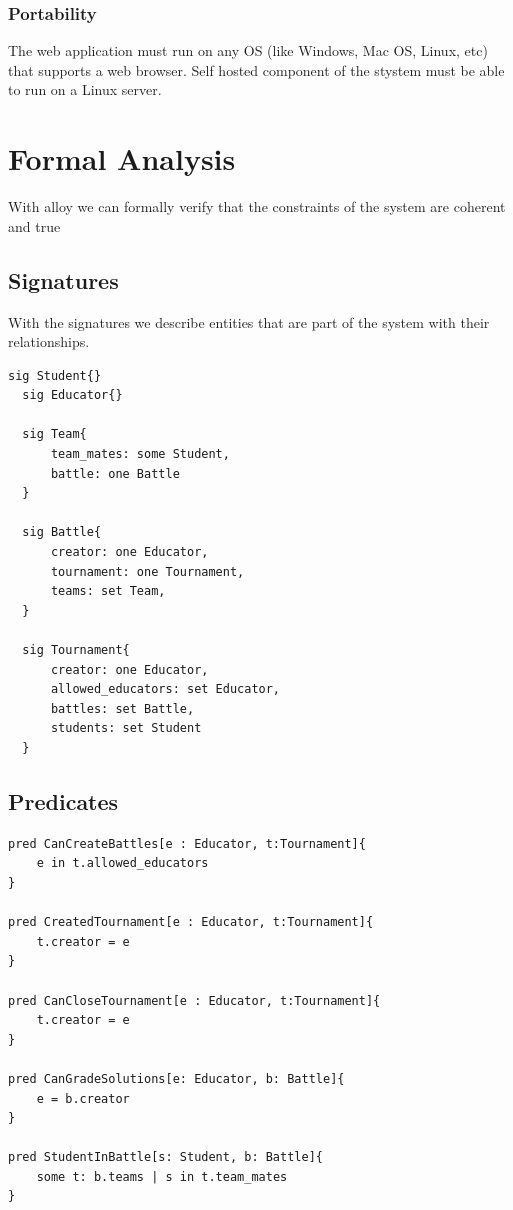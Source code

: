 \documentclass{article}
\begin{document}
\subsubsection{Portability}			
The web application must run on any OS (like Windows, Mac OS, Linux, etc) that supports a web browser.
Self hosted component of the stystem must be able to run on a Linux server.

\newpage
\section{Formal Analysis}
With alloy we can formally verify that the constraints of the system are coherent and true

\subsection{Signatures}
With the signatures we describe entities that are part of the system with their relationships.
\begin{lstlisting}[language=alloy]
  sig Student{}
  sig Educator{}
  
  sig Team{
      team_mates: some Student,
      battle: one Battle
  }
  
  sig Battle{
      creator: one Educator,
      tournament: one Tournament,
      teams: set Team,
  }
  
  sig Tournament{
      creator: one Educator,
      allowed_educators: set Educator,
      battles: set Battle,
      students: set Student
  }
\end{lstlisting}

\subsection{Predicates}
\begin{lstlisting}[language=alloy]
pred CanCreateBattles[e : Educator, t:Tournament]{
    e in t.allowed_educators
}

pred CreatedTournament[e : Educator, t:Tournament]{
    t.creator = e
}

pred CanCloseTournament[e : Educator, t:Tournament]{
    t.creator = e
}

pred CanGradeSolutions[e: Educator, b: Battle]{
    e = b.creator
}

pred StudentInBattle[s: Student, b: Battle]{
    some t: b.teams | s in t.team_mates
}
\end{lstlisting}
\end{document}
